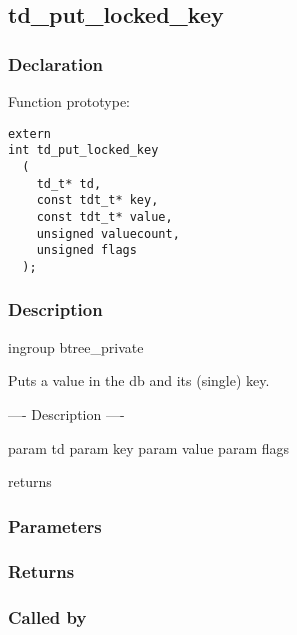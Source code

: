 
\newpage
\subsection{td\_put\_locked\_key}
\subsubsection{Declaration} Function prototype:

\begin{verbatim}
extern
int td_put_locked_key
  (
    td_t* td,
    const tdt_t* key,
    const tdt_t* value,
    unsigned valuecount,
    unsigned flags
  );
\end{verbatim}

\subsubsection{Description}


 ingroup btree\_private

 Puts a value in the db and its (single) key.
 
 ---- Description ----

 param td
 param key
 param value
 param flags

 returns
 

\subsubsection{Parameters}
\subsubsection{Returns}
\subsubsection{Called by}
